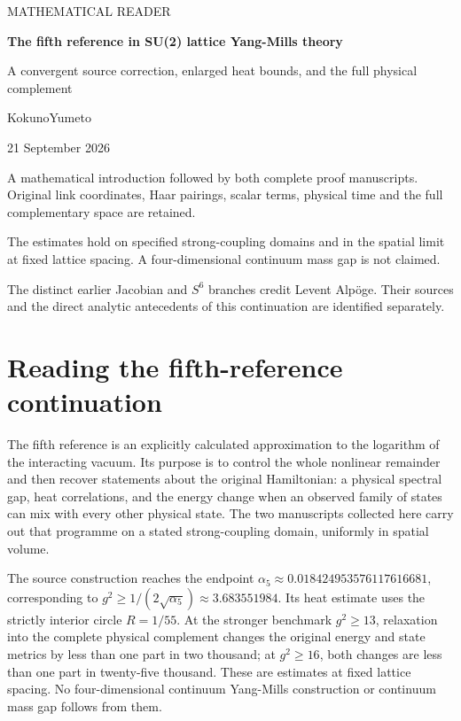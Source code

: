 \documentclass[11pt,a4paper]{article}
\let\originalsection\section
\renewcommand{\section}{\clearpage\originalsection}
\begin{document}
\begin{titlepage}
\vspace*{14mm}
{\sffamily\Large MATHEMATICAL READER\par}
\vspace{12mm}
{\LARGE\bfseries The fifth reference in SU(2) lattice Yang-Mills
theory\par}
\vspace{9mm}
{\large A convergent source correction, enlarged heat bounds, and the
full physical complement\par}
\vspace{13mm}
{\large KokunoYumeto\par}
\vspace{3mm}
{21 September 2026\par}
\vfill
\begin{minipage}{0.96\textwidth}
A mathematical introduction followed by both complete proof manuscripts. Original link coordinates, Haar pairings, scalar terms, physical time and the full complementary space are retained.

\medskip
The estimates hold on specified strong-coupling domains and in the spatial limit at fixed lattice spacing. A four-dimensional continuum mass gap is not claimed.

\medskip
The distinct earlier Jacobian and \(S^6\) branches credit Levent Alpöge. Their sources and the direct analytic antecedents of this continuation are identified separately.
\end{minipage}
\vspace{10mm}
\end{titlepage}
\tableofcontents
\clearpage
{}
\section{Reading the fifth-reference
continuation}\label{reading-the-fifth-reference-continuation}

The fifth reference is an explicitly calculated approximation to the
logarithm of the interacting vacuum. Its purpose is to control the whole
nonlinear remainder and then recover statements about the original
Hamiltonian: a physical spectral gap, heat correlations, and the energy
change when an observed family of states can mix with every other
physical state. The two manuscripts collected here carry out that
programme on a stated strong-coupling domain, uniformly in spatial
volume.

The source construction reaches the endpoint
\(\alpha_5\approx0.018424953576117616681\), corresponding to
\(g^2\geq1/(2\sqrt{\alpha_5})\approx3.683551984\). Its heat estimate
uses the strictly interior circle \(R=1/55\). At the stronger benchmark
\(g^2\geq13\), relaxation into the complete physical complement changes
the original energy and state metrics by less than one part in two
thousand; at \(g^2\geq16\), both changes are less than one part in
twenty-five thousand. These are estimates at fixed lattice spacing. No
four-dimensional continuum Yang-Mills construction or continuum mass gap
follows from them.
\end{document}
